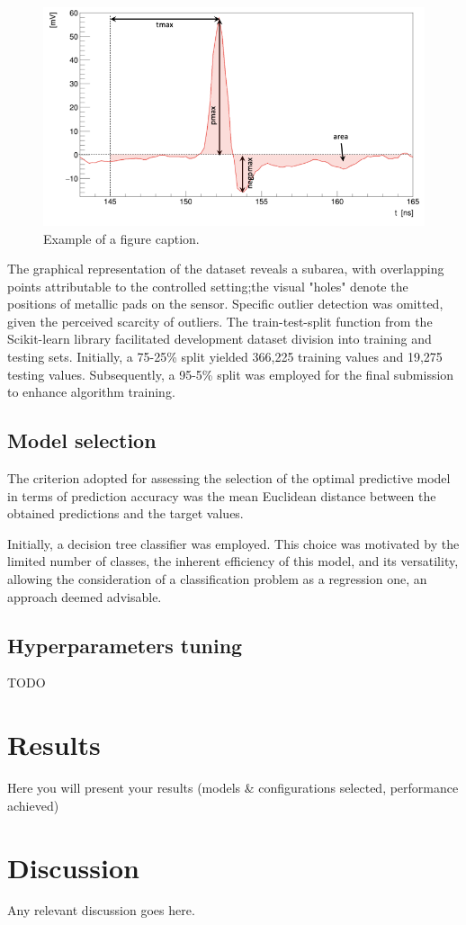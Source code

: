 \documentclass[conference]{IEEEtran}
\begin{document}
\begin{figure}[htbp]
\centerline{\includegraphics[width=\linewidth]{media/sensor_signal.png}}
\caption{Example of a figure caption.}
\label{fig2}
\end{figure}

The graphical representation of the dataset reveals a subarea, with overlapping points attributable to the controlled setting;the visual "holes" denote the positions of metallic pads on the sensor.
Specific outlier detection was omitted, given the perceived scarcity of outliers.
The train-test-split function from the Scikit-learn library facilitated development dataset division into training and testing sets. Initially, a 75-25\% split yielded 366,225 training values and 19,275 testing values. Subsequently, a 95-5\% split was employed for the final submission to enhance algorithm training.

 
\subsection{Model selection}
 
The criterion adopted for assessing the selection of the optimal predictive model in terms of prediction accuracy was the mean Euclidean distance between the obtained predictions and the target values.

Initially, a decision tree classifier was employed. This choice was motivated by the limited number of classes, the inherent efficiency of this model, and its versatility, allowing the consideration of a classification problem as a regression one, an approach deemed advisable.


\subsection{Hyperparameters tuning}
TODO

\section{Results}
Here you will present your results (models \& configurations selected, performance achieved)

\section{Discussion}
Any relevant discussion goes here.



\end{document}
